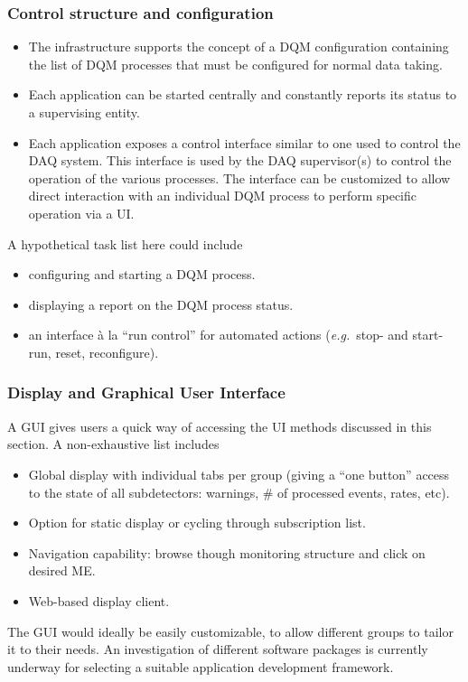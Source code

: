 \documentclass[a4paper]{cmspaper}
\newcommand {\eg}{\mbox{\sl e.g. }}     %
\begin{document}
\subsubsection{Control structure and configuration}
\label{sec:control_structure}
\begin{itemize}
\item{The infrastructure supports the concept of a DQM configuration
containing the list of DQM processes that must be configured  for normal
data taking.}
\item{Each application can be started centrally and constantly
reports its status to a supervising entity.}
\item{Each application exposes a control interface similar to one used to
control the DAQ system. This interface is used  by the DAQ supervisor(s) to
control the operation of the various processes. The interface can be
customized to allow direct interaction with an individual DQM process to
perform specific  operation via a UI.}
\end{itemize}
%
A hypothetical task list here could include
\begin{itemize}
\item{configuring and starting a DQM process.}
\item{displaying a report on the DQM process status.}
\item{an interface \`a la ``run control'' for automated actions
(\eg stop- and start-run, reset, reconfigure).}
\end{itemize}
%
%
\subsubsection{Display and Graphical User Interface}
A GUI gives users a quick way of accessing the UI methods discussed in
this section. A non-exhaustive list includes
\begin{itemize}
\item{Global display with individual tabs per group (giving a ``one button''
access to the state of all subdetectors: warnings, \# of processed
events, rates, etc).}
\item{Option for static display or cycling through subscription list.}
\item{Navigation capability: browse though monitoring structure and click
on desired ME.}
\item{Web-based display client.}
\end{itemize}
%
The GUI would ideally be easily customizable, to allow different
groups to tailor it to their needs. An investigation of different
software packages is currently underway for selecting a
suitable application development framework.
%
%
\newpage
\appendix 
\bigskip
\end{document}
